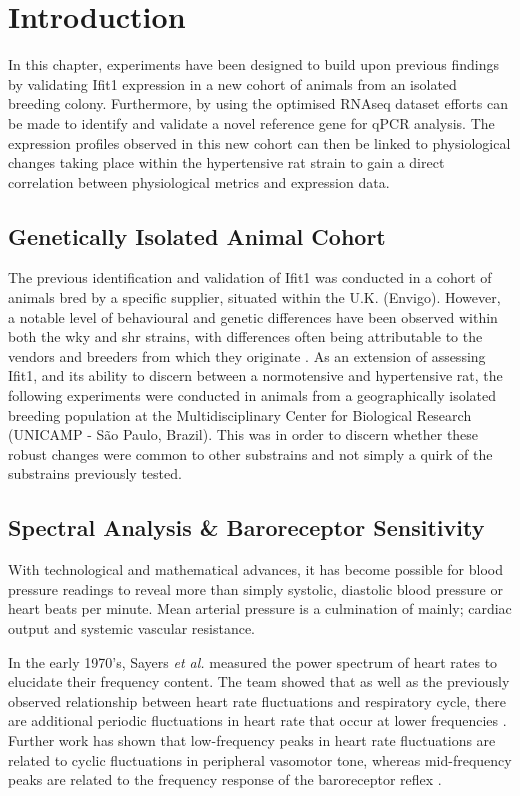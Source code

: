 \doublespacing
\section{Introduction}

In this chapter, experiments have been designed to build upon previous findings by validating Ifit1 expression in a new cohort of animals from an isolated breeding colony. Furthermore, by using the optimised RNAseq dataset efforts can be made to identify and validate a novel reference gene for qPCR analysis. The expression profiles observed in this new cohort can then be linked to physiological changes taking place within the hypertensive rat strain to gain a direct correlation between physiological metrics and expression data.

\subsection{Genetically Isolated Animal Cohort}

The previous identification and validation of Ifit1 was conducted in a cohort of animals bred by a specific supplier, situated within the U.K. (Envigo). However, a notable level of behavioural and genetic differences have been observed within both the \acrshort{wky} and \acrshort{shr} strains, with differences often being attributable to the vendors and breeders from which they originate \cite{doi:10.1152/physiolgenomics.00002.2013}. As an extension of assessing Ifit1, and its ability to discern between a normotensive and hypertensive rat, the following experiments were conducted in animals from a geographically isolated breeding population at the Multidisciplinary Center for Biological Research (UNICAMP - São Paulo, Brazil). This was in order to discern whether these robust changes were common to other substrains and not simply a quirk of the substrains previously tested.  

\subsection{Spectral Analysis \& Baroreceptor Sensitivity}

With technological and mathematical advances, it has become possible for blood pressure readings to reveal more than simply systolic, diastolic blood pressure or heart beats per minute. Mean arterial pressure is a culmination of mainly; cardiac output and systemic vascular resistance. 

In the early 1970's, Sayers \textit{et al.} measured the power spectrum of heart rates to elucidate their frequency content. The team showed that as well as the previously observed relationship between heart rate fluctuations and respiratory cycle, there are additional periodic fluctuations in heart rate that occur at lower frequencies \cite{Sayers1973,Chess1975}. Further work has shown that low-frequency peaks in heart rate fluctuations are related to cyclic fluctuations in peripheral vasomotor tone, whereas mid-frequency peaks are related to the frequency response of the baroreceptor reflex \cite{Hyndman1971}. 

